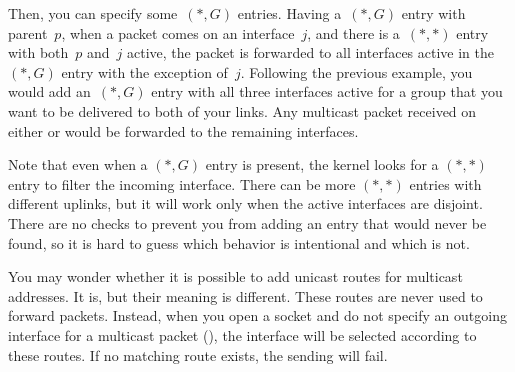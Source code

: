 Then, you can specify some~$(*,G)$ entries. Having a~$(*,G)$ entry with parent~$p$,
when a packet comes on an interface~$j$, and there is a~$(*,*)$ entry with
both~$p$ and~$j$ active, the packet is forwarded to all interfaces active in
the~$(*,G)$ entry with the exception of~$j$. Following the previous example,
you would add an~$(*,G)$ entry with all three interfaces active for a group
that you want to be delivered to both of your links. Any multicast packet
received on either  or  would be forwarded to the
remaining interfaces.

Note that even when a $(*,G)$ entry is present, the kernel looks for a $(*,*)$
entry to filter the incoming interface. There can be more $(*,*)$ entries with
different uplinks, but it will work only when the active interfaces are
disjoint. There are no checks to prevent you from adding an entry that would
never be found, so it is hard to guess which behavior is intentional and which
is not.

You may wonder whether it is possible to add unicast routes for multicast
addresses. It is, but their meaning is different. These routes are never used
to forward packets. Instead, when you open a socket and do not specify an
outgoing interface for a multicast packet (), the interface
will be selected according to these routes. If no matching route exists, the sending
will fail.
